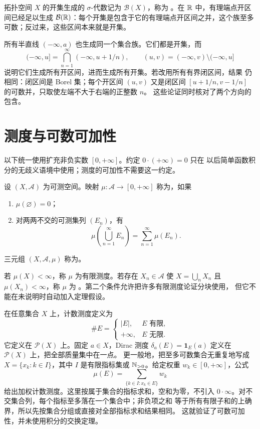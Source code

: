 拓扑空间 $X$ 的开集生成的 $\sigma$-代数记为 $\mathcal B(X)$，称为
。在 $\mathbb{R}$ 中，有理端点开区间已经足以生成
$\mathcal B(\mathbb{R})$：每个开集是包含于它的有理端点开区间之并，这个族至多
可数；反过来，这些区间本来就是开集。

所有半直线 $(-\infty,a)$ 也生成同一个集合族。它们都是开集，而
\[
 (-\infty,u]=\bigcap_{n=1}^{\infty}(-\infty,u+1/n),\qquad
 (u,v)=(-\infty,v)\setminus(-\infty,u]
\]
说明它们生成所有开区间，进而生成所有开集。若改用所有有界闭区间，结果
仍相同：闭区间是 Borel 集；每个开区间 $(u,v)$ 又是闭区间
$[u+1/n,v-1/n]$ 的可数并，只取使左端不大于右端的正整数 $n$。
这些论证同时核对了两个方向的包含。

\section{测度与可数可加性}

以下统一使用扩充非负实数 $[0,+\infty]$。约定 $0\cdot(+\infty)=0$ 只在
以后简单函数积分的无歧义语境中使用；测度的可加性不需要这一约定。

\begin{definition}
设 $(X,\mathcal A)$ 为可测空间。映射
$\mu:\mathcal A\to[0,+\infty]$ 称为，如果
\begin{enumerate}[label=\textup{(\roman*)}]
 \item $\mu(\varnothing)=0$；
 \item 对两两不交的可测集列 $(E_n)$，有
 \[
  \mu\!\left(\bigcup_{n=1}^{\infty}E_n\right)
  =\sum_{n=1}^{\infty}\mu(E_n).
 \]
\end{enumerate}
三元组 $(X,\mathcal A,\mu)$ 称为。
\end{definition}

若 $\mu(X)<\infty$，称 $\mu$ 为有限测度。若存在 $X_n\in\mathcal A$ 使
$X=\bigcup_nX_n$ 且 $\mu(X_n)<\infty$，称 $\mu$ 为
。第二个条件允许把许多有限测度论证分块使用，
但它不能在未说明时自动加入定理假设。

\begin{example}
在任意集合 $X$ 上，计数测度定义为
\[
 \#E=\begin{cases}|E|,&E\text{ 有限},\\+\infty,&E\text{ 无限}.
 \end{cases}
\]
它定义在 $\mathcal P(X)$ 上。固定 $a\in X$，Dirac 测度
$\delta_a(E)=\mathbf1_E(a)$ 定义在 $\mathcal P(X)$ 上，把全部质量集中在一点。
更一般地，把至多可数集合无重复地写成 $X=\{x_k:k\in I\}$，其中 $I$
是有限指标集或 $\mathbb{N}_{>0}$。给定权重 $w_k\in[0,+\infty]$，公式
\[
 \mu(E)=\sum_{\{k\in I:x_k\in E\}}w_k
\]
给出加权计数测度。这里按属于集合的指标求和，空和为零，不引入
$0\cdot\infty$。对不交集合列，每个指标至多落在一个集合中；非负项之和
等于所有有限子和的上确界，所以先按集合分组或直接对全部指标求和结果相同。
这就验证了可数可加性，并未使用积分的交换定理。
\end{example}


